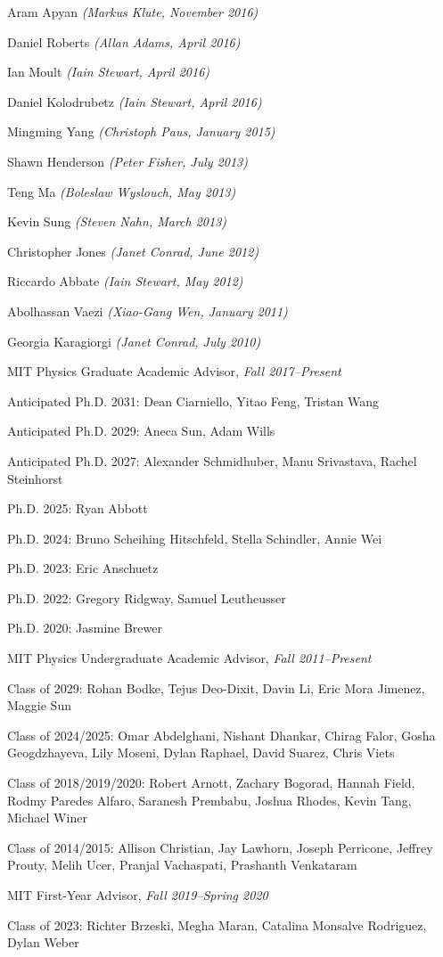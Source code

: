 \item Aram Apyan \textit{(Markus Klute, November 2016)}
\item Daniel Roberts \textit{(Allan Adams, April 2016)}
\item Ian Moult \textit{(Iain Stewart, April 2016)}
\item Daniel Kolodrubetz \textit{(Iain Stewart, April 2016)}
\item Mingming Yang \textit{(Christoph Paus, January 2015)}
\item Shawn Henderson \textit{(Peter Fisher, July 2013)}
\item Teng Ma \textit{(Boleslaw Wyslouch, May 2013)}
\item Kevin Sung \textit{(Steven Nahn, March 2013)}
\item Christopher Jones \textit{(Janet Conrad, June 2012)}
\item Riccardo Abbate \textit{(Iain Stewart, May 2012)}
\item Abolhassan Vaezi \textit{(Xiao-Gang Wen, January 2011)}
\item Georgia Karagiorgi \textit{(Janet Conrad, July 2010)}
\el 
\item MIT Physics Graduate Academic Advisor, \emph{Fall 2017--Present}
\bsbl 
\item Anticipated Ph.D. 2031: Dean Ciarniello, Yitao Feng, Tristan Wang
\item Anticipated Ph.D. 2029: Aneca Sun, Adam Wills
\item Anticipated Ph.D. 2027: Alexander Schmidhuber, Manu Srivastava, Rachel Steinhorst
\item Ph.D. 2025: Ryan Abbott
\item Ph.D. 2024: Bruno Scheihing Hitschfeld, Stella Schindler, Annie Wei
\item Ph.D. 2023: Eric Anschuetz
\item Ph.D. 2022: Gregory Ridgway, Samuel Leutheusser
\item Ph.D. 2020: Jasmine Brewer
\el 
\item MIT Physics Undergraduate Academic Advisor, \emph{Fall 2011--Present}
\bsbl 
\item Class of 2029: Rohan Bodke, Tejus Deo-Dixit, Davin Li, Eric Mora Jimenez, Maggie Sun
\item Class of 2024/2025: Omar Abdelghani, Nishant Dhankar, Chirag Falor, Gosha Geogdzhayeva, Lily Moseni, Dylan Raphael, David Suarez, Chris Viets
\item Class of 2018/2019/2020: Robert Arnott, Zachary Bogorad, Hannah Field, Rodmy Paredes Alfaro, Saranesh Prembabu, Joshua Rhodes, Kevin Tang, Michael Winer
\item Class of 2014/2015: Allison Christian, Jay Lawhorn, Joseph Perricone, Jeffrey Prouty, Melih Ucer, Pranjal Vachaspati, Prashanth Venkataram
\el 
\item MIT First-Year Advisor, \emph{Fall 2019--Spring 2020}
\bsbl 
\item Class of 2023: Richter Brzeski, Megha Maran, Catalina Monsalve Rodriguez, Dylan Weber
\el 

